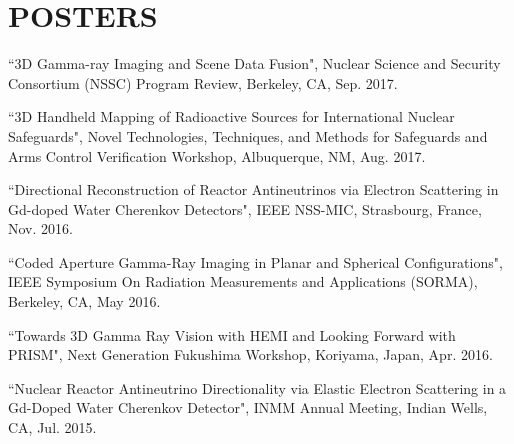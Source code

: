 \section{\small{POSTERS}}

 \begin{thebibliography}{3}
 \raggedright
 \vspace{10pt}

 ``3D Gamma-ray Imaging and Scene Data Fusion", Nuclear Science and Security Consortium (NSSC) Program Review, Berkeley, CA, Sep. 2017.

 ``3D Handheld Mapping of Radioactive Sources for International Nuclear Safeguards", Novel Technologies, Techniques, and Methods for Safeguards and Arms Control Verification Workshop, Albuquerque, NM, Aug. 2017.

 ``Directional Reconstruction of Reactor Antineutrinos via Electron Scattering in Gd-doped Water Cherenkov Detectors", IEEE NSS-MIC, Strasbourg, France, Nov. 2016. 

  ``Coded Aperture Gamma-Ray Imaging in Planar and Spherical Configurations", IEEE Symposium On Radiation Measurements and Applications (SORMA), Berkeley, CA, May 2016.

  ``Towards 3D Gamma Ray Vision with HEMI and Looking Forward with PRISM", Next Generation Fukushima Workshop, Koriyama, Japan, Apr. 2016.
 
  ``Nuclear Reactor Antineutrino Directionality via Elastic Electron Scattering in a Gd-Doped Water Cherenkov Detector", INMM Annual Meeting, Indian Wells, CA, Jul. 2015.
 
 \end{thebibliography}
